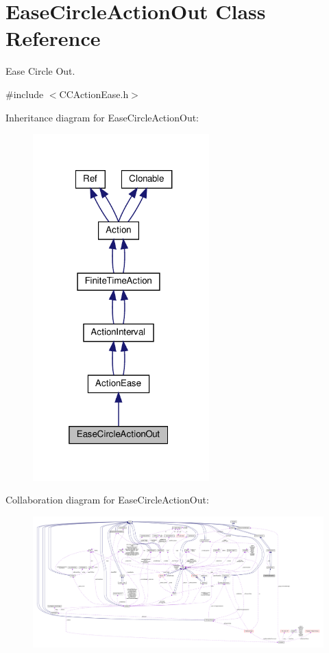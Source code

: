 \hypertarget{classEaseCircleActionOut}{}\section{Ease\+Circle\+Action\+Out Class Reference}
\label{classEaseCircleActionOut}


Ease Circle Out.  




{\ttfamily \#include $<$C\+C\+Action\+Ease.\+h$>$}



Inheritance diagram for Ease\+Circle\+Action\+Out\+:
\nopagebreak
\begin{figure}[H]
\begin{center}
\leavevmode
\includegraphics[width=193pt]{classEaseCircleActionOut__inherit__graph}
\end{center}
\end{figure}


Collaboration diagram for Ease\+Circle\+Action\+Out\+:
\nopagebreak
\begin{figure}[H]
\begin{center}
\leavevmode
\includegraphics[width=350pt]{classEaseCircleActionOut__coll__graph}
\end{center}
\end{figure}
